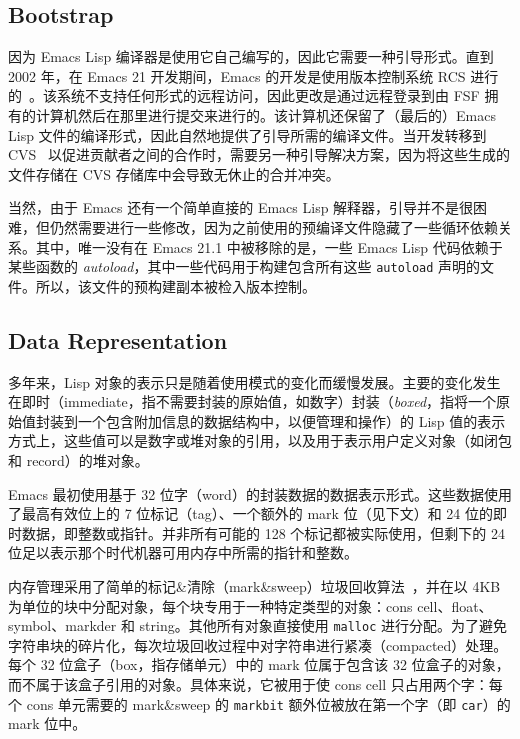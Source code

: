 \documentclass[format=acmsmall,screen]{acmart}
\begin{document}
\subsection{Bootstrap}
\label{sec:bootstrap}

因为 Emacs Lisp 编译器是使用它自己编写的，因此它需要一种引导形式。直到 2002 年，在 Emacs 21 开发期间，Emacs 的开发是使用版本控制系统 RCS 进行的~\cite{Tichy85}。该系统不支持任何形式的远程访问，因此更改是通过远程登录到由 FSF 拥有的计算机然后在那里进行提交来进行的。该计算机还保留了（最后的）Emacs Lisp 文件的编译形式，因此自然地提供了引导所需的编译文件。当开发转移到 CVS~\cite{Berliner90} 以促进贡献者之间的合作时，需要另一种引导解决方案，因为将这些生成的文件存储在 CVS 存储库中会导致无休止的合并冲突。

当然，由于 Emacs 还有一个简单直接的 Emacs Lisp 解释器，引导并不是很困难，但仍然需要进行一些修改，因为之前使用的预编译文件隐藏了一些循环依赖关系。其中，唯一没有在 Emacs 21.1 中被移除的是，一些 Emacs Lisp 代码依赖于某些函数的 \emph{autoload}，其中一些代码用于构建包含所有这些 \texttt{autoload} 声明的文件。所以，该文件的预构建副本被检入版本控制。

\subsection{Data Representation}
\label{sec:data-representation}

多年来，Lisp 对象的表示只是随着使用模式的变化而缓慢发展。主要的变化发生在即时（immediate，指不需要封装的原始值，如数字）封装（\emph{boxed}，指将一个原始值封装到一个包含附加信息的数据结构中，以便管理和操作）的 Lisp 值的表示方式上，这些值可以是数字或堆对象的引用，以及用于表示用户定义对象（如闭包和 record）的堆对象。

Emacs 最初使用基于 32 位字（word）的封装数据的数据表示形式。这些数据使用了最高有效位上的 7 位标记（tag）、一个额外的 mark 位（见下文）和 24 位的即时数据，即整数或指针。并非所有可能的 128 个标记都被实际使用，但剩下的 24 位足以表示那个时代机器可用内存中所需的指针和整数。

内存管理采用了简单的标记\&清除（mark\&sweep）垃圾回收算法~\cite{McCarthy1960}，并在以 4KB 为单位的块中分配对象，每个块专用于一种特定类型的对象：cons cell、float、symbol、markder 和 string。其他所有对象直接使用 \texttt{malloc} 进行分配。为了避免字符串块的碎片化，每次垃圾回收过程中对字符串进行紧凑（compacted）处理。每个 32 位盒子（box，指存储单元）中的 mark 位属于包含该 32 位盒子的对象，而不属于该盒子引用的对象。具体来说，它被用于使 cons cell 只占用两个字：每个 cons 单元需要的 mark\&sweep 的 \texttt{markbit} 额外位被放在第一个字（即 \texttt{car}）的 mark 位中。
\end{document}
